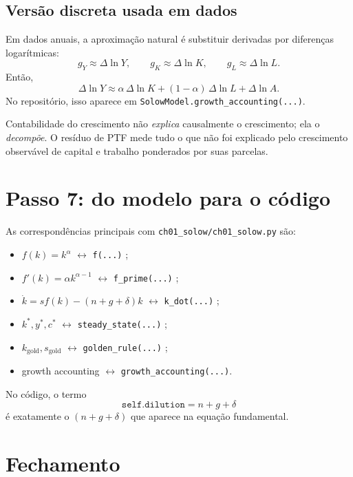 \documentclass[11pt,a4paper]{article}
\begin{document}
\subsection{Vers\~ao discreta usada em dados}

Em dados anuais, a aproxima\c{c}\~ao natural \'e substituir derivadas por
diferen\c{c}as logar\'itmicas:
\[
g_Y\approx \Delta\ln Y,
\qquad
g_K\approx \Delta\ln K,
\qquad
g_L\approx \Delta\ln L.
\]
Ent\~ao,
\[
\Delta\ln Y
\approx
\alpha\,\Delta\ln K+(1-\alpha)\,\Delta\ln L+\Delta\ln A.
\]
No reposit\'orio, isso aparece em
\texttt{SolowModel.growth\_accounting(...)}.

\begin{intuicao}
Contabilidade do crescimento n\~ao \emph{explica} causalmente o crescimento; ela
o \emph{decomp\~oe}. O res\'iduo de PTF mede tudo o que n\~ao foi explicado pelo
crescimento observ\'avel de capital e trabalho ponderados por suas parcelas.
\end{intuicao}

\section{Passo 7: do modelo para o c\'odigo}

As correspond\^encias principais com
\texttt{ch01\_solow/ch01\_solow.py} s\~ao:
\begin{itemize}
  \item \(f(k)=k^\alpha\) \(\leftrightarrow\) \texttt{f(...)} ;
  \item \(f'(k)=\alpha k^{\alpha-1}\) \(\leftrightarrow\) \texttt{f\_prime(...)} ;
  \item \(\dot{k}=sf(k)-(n+g+\delta)k\) \(\leftrightarrow\) \texttt{k\_dot(...)} ;
  \item \(k^\ast,y^\ast,c^\ast\) \(\leftrightarrow\) \texttt{steady\_state(...)} ;
  \item \(k_{\text{gold}},s_{\text{gold}}\) \(\leftrightarrow\) \texttt{golden\_rule(...)} ;
  \item growth accounting \(\leftrightarrow\) \texttt{growth\_accounting(...)}.
\end{itemize}

No c\'odigo, o termo
\[
\texttt{self.dilution}=n+g+\delta
\]
\'e exatamente o \((n+g+\delta)\) que aparece na equa\c{c}\~ao fundamental.

\section{Fechamento}
\end{document}
